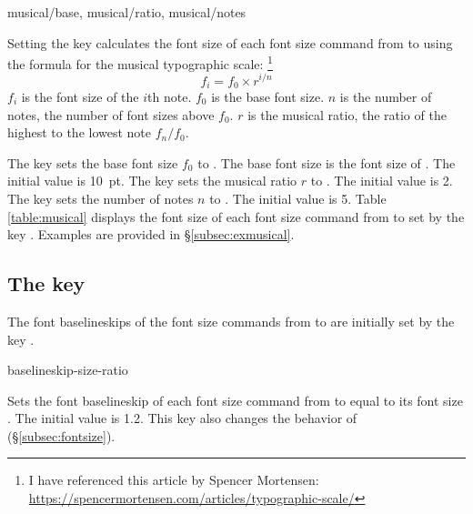 \documentclass{beerydoc}
\begin{document}
\begin{codedoc}{musical/base, musical/ratio, musical/notes}
  \begin{syntax}
  \end{syntax}
  Setting the key  calculates the font size of
  each font size command from  to  using the formula for the
  musical typographic scale:%
  \footnote
    {%
      I have referenced this article by Spencer Mortensen:
      \newline
      \url{https://spencermortensen.com/articles/typographic-scale/}%
    }
  \begin{equation*}
    f_i = f_0 \times r ^ { i / n }
  \end{equation*}
  $f_i$ is the font size of the $i$th note.
  $f_0$ is the base font size.
  $n$ is the number of notes, the number of font sizes above $f_0$.
  $r$ is the musical ratio, the ratio of the highest to the lowest note
  $ f_n / f_0 $.

  The key  sets the base font size $f_0$ to .
  The base font size is the font size of .
  The initial value is \qty{10}{pt}.
  The key  sets the musical ratio $r$ to .
  The initial value is \num{2}.
  The key  sets the number of notes $n$ to .
  The initial value is \num{5}.
  Table \ref{table:musical} displays the font size of each font size command
  from  to  set by the key .
  Examples are provided in \S\ref{subsec:exmusical}.
\end{codedoc}



\subsection{The key }
\label{subsec:baselineskipsizeratio}

The font baselineskips of the font size commands from  to 
are initially set by the key .

\begin{codedoc}{baselineskip-size-ratio}
  \begin{syntax}
  \end{syntax}
  Sets the font baselineskip of each font size command from  to
   equal to its font size \texttimes{} .
  The initial value is \num{1.2}.
  This key also changes the behavior of 
  (\S\ref{subsec:fontsize}).
\end{codedoc}
\end{document}
